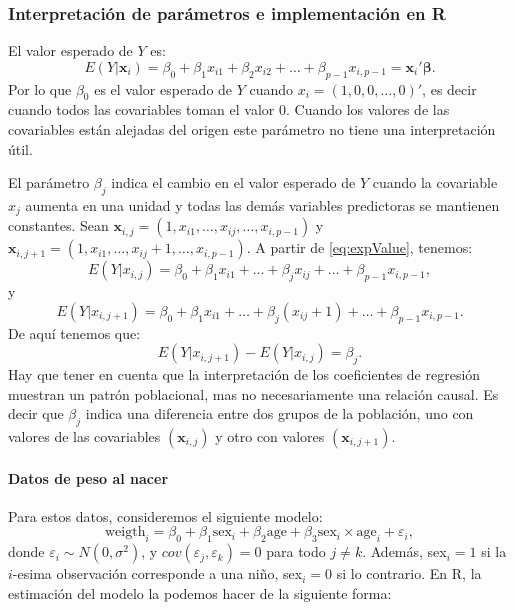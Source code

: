 \documentclass[
]{article}
\begin{document}
\subsubsection{Interpretación de parámetros e implementación en R}\label{interpretaciuxf3n-de-paruxe1metros-e-implementaciuxf3n-en-r}

El valor esperado de \(Y\) es:
\begin{equation}
E(Y| \boldsymbol x_{i}) = \beta_{0} + \beta_{1}x_{i1} + \beta_{2}x_{i2} + \ldots + \beta_{p-1} x_{i,p-1} = \boldsymbol x_{i}'\boldsymbol \beta.
\label{eq:expValue}
\end{equation}
Por lo que \(\beta_{0}\) es el valor esperado de \(Y\) cuando \(x_{i}=(1,0,0,\ldots,0)'\), es decir cuando todos las covariables toman el valor \(0\). Cuando los valores de las covariables están alejadas del origen este parámetro no tiene una interpretación útil.

El parámetro \(\beta_{j}\) indica el cambio en el valor esperado de \(Y\) cuando la covariable \(x_{j}\) aumenta en una unidad y todas las demás variables predictoras se mantienen constantes. Sean \(\boldsymbol x_{i,j} = (1,x_{i1},\ldots,x_{ij},\ldots,x_{i,p-1})\) y \(\boldsymbol x_{i,j+1} = (1,x_{i1},\ldots,x_{ij}+1,\ldots,x_{i,p-1})\). A partir de \eqref{eq:expValue}, tenemos:
\[
E(Y|x_{i,j}) = \beta_{0} + \beta_{1}x_{i1} + \ldots + \beta_{j}x_{ij} + \ldots + \beta_{p-1} x_{i,p-1},
\]
y
\[
E(Y|x_{i,j+1}) = \beta_{0} + \beta_{1}x_{i1} + \ldots + \beta_{j}(x_{ij}+1) + \ldots + \beta_{p-1} x_{i,p-1}.
\]
De aquí tenemos que:
\[
E(Y|x_{i,j+1}) - E(Y|x_{i,j}) = \beta_{j}.
\]
Hay que tener en cuenta que la interpretación de los coeficientes de regresión muestran un patrón poblacional, mas no necesariamente una relación causal. Es decir que \(\beta_j\) indica una diferencia entre dos grupos de la población, uno con valores de las covariables \((\boldsymbol x_{i,j})\) y otro con valores \((\boldsymbol x_{i,j+1})\).

\paragraph*{Datos de peso al nacer}\label{datos-de-peso-al-nacer-1}

Para estos datos, consideremos el siguiente modelo:
\[
\mbox{weigth}_i = \beta_{0} + \beta_{1}\mbox{sex}_i + \beta_{2}\mbox{age} + \beta_{3}\mbox{sex}_i \times \mbox{age}_i + \varepsilon_i,
\]
donde \(\varepsilon_{i}\sim N(0,\sigma^{2})\), y \(cov(\varepsilon_{j},\varepsilon_{k})=0\) para todo \(j\neq k\). Además, sex\(_i=1\) si la \(i\)-esima observación corresponde a una niño, sex\(_i=0\) si lo contrario. En R, la estimación del modelo la podemos hacer de la siguiente forma:
\end{document}

